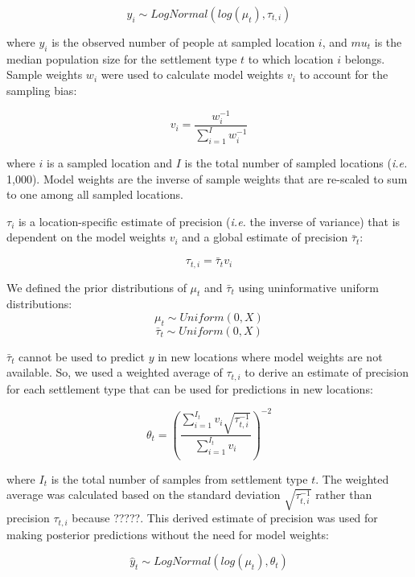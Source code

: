 \documentclass[9pt,twocolumn,twoside,lineno]{pnas-new}
\begin{document}
{	\[ y_i \sim LogNormal( log( \mu_t ), \tau_{t,i} ) \]
	
	\noindent where $y_i$ is the observed number of people at sampled location $i$, and $mu_t$ is the median population size for the settlement type $t$ to which location $i$ belongs. Sample weights $w_i$ were used to calculate model weights $v_i$ to account for the sampling bias:
	
	\[ v_i = \frac{ w_i^{-1} } { \sum_{i=1}^{I} w_i^{-1} }  \]
	
	\noindent where $i$ is a sampled location and $I$ is the total number of sampled locations (\textit{i.e.} 1,000).  Model weights are the inverse of sample weights that are re-scaled to sum to one among all sampled locations.
	
	$\tau_i$ is a location-specific estimate of precision (\textit{i.e.} the inverse of variance) that is dependent on the model weights $v_i$ and a global estimate of precision $\bar{\tau}_t$:
	
	\[ \tau_{t,i} = \bar{\tau}_t v_i \]
	
	
	
	
	We defined the prior distributions of $\mu_t$ and $\bar{\tau}_t$ using uninformative uniform distributions:
	 \[ \mu_t \sim Uniform(0, X) \]
	 \[ \bar{\tau}_t \sim Uniform(0, X) \]
	
	$\bar{\tau}_t$ cannot be used to predict $y$ in new locations where model weights are not available.  So, we used a weighted average of $\tau_{t,i}$ to derive an estimate of precision for each settlement type that can be used for predictions in new locations:
	
	\[ \theta_t = (\frac{\sum_{i=1}^{I_t} v_i \sqrt{\tau_{t,i}^{-1}} }{\sum_{i=1}^{I_t} v_i})^{-2}   \]
	
	\noindent where $I_t$ is the total number of samples from settlement type $t$. The weighted average was calculated based on the standard deviation $\sqrt{\tau_{t,i}^{-1}}$ rather than precision $\tau_{t,i}$ because ?????. This derived estimate of precision was used for making posterior predictions without the need for model weights:
	
	\[ \hat{y}_t \sim LogNormal( log( \mu_t ), \theta_t) \]


	
}

\showmatmethods{}


\showacknow{}


\end{document}
